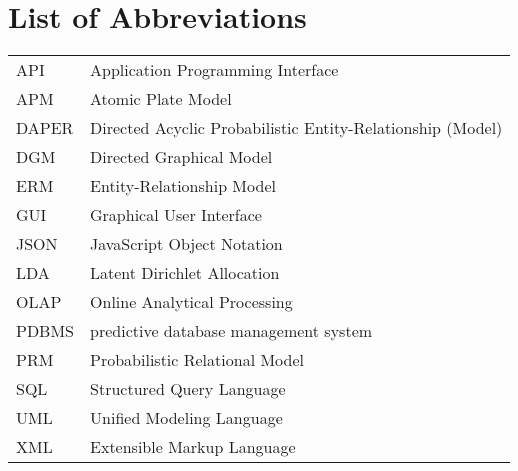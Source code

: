 \section*{List of Abbreviations}

\begin{tabular}{ll}
API & Application Programming Interface\\
APM & Atomic Plate Model\\
DAPER & Directed Acyclic Probabilistic Entity-Relationship (Model)\\
DGM & Directed Graphical Model\\
ERM & Entity-Relationship Model\\
GUI & Graphical User Interface\\
JSON & JavaScript Object Notation\\
LDA & Latent Dirichlet Allocation\\
OLAP & Online Analytical Processing\\
PDBMS & predictive database management system\\
PRM & Probabilistic Relational Model\\
SQL & Structured Query Language\\
UML & Unified Modeling Language\\
XML & Extensible Markup Language

\end{tabular}